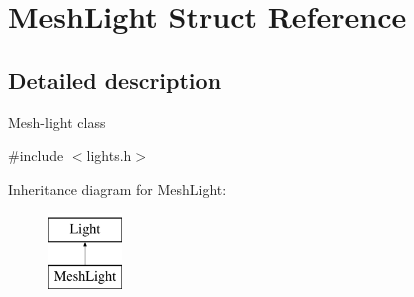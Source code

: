 \hypertarget{struct_mesh_light}{}\section{Mesh\+Light Struct Reference}
\label{struct_mesh_light}


\subsection{Detailed description}
Mesh-\/light class 

{\ttfamily \#include $<$lights.\+h$>$}

Inheritance diagram for Mesh\+Light\+:\begin{figure}[H]
\begin{center}
\leavevmode
\includegraphics[height=2.000000cm]{struct_mesh_light}
\end{center}
\end{figure}
